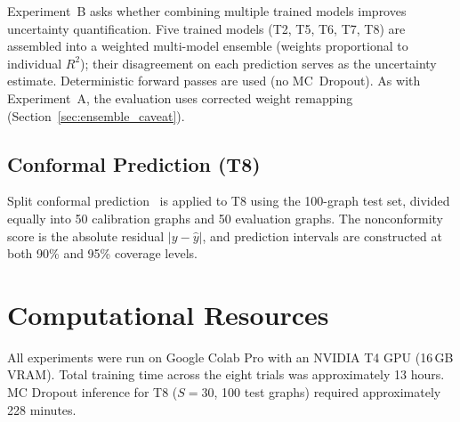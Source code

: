 Experiment~B asks whether combining multiple trained models improves uncertainty quantification. Five trained models (T2, T5, T6, T7, T8) are assembled into a weighted multi-model ensemble (weights proportional to individual $R^2$); their disagreement on each prediction serves as the uncertainty estimate. Deterministic forward passes are used (no MC~Dropout). As with Experiment~A, the evaluation uses corrected weight remapping (Section~\ref{sec:ensemble_caveat}).

\subsection{Conformal Prediction (T8)}

Split conformal prediction~\cite{angelopoulos2023conformal} is applied to T8 using the 100-graph test set, divided equally into 50 calibration graphs and 50 evaluation graphs. The nonconformity score is the absolute residual $|y - \hat{y}|$, and prediction intervals are constructed at both 90\% and 95\% coverage levels.

\section{Computational Resources}

All experiments were run on Google Colab Pro with an NVIDIA T4 GPU (16\,GB VRAM). Total training time across the eight trials was approximately 13 hours. MC Dropout inference for T8 ($S = 30$, 100 test graphs) required approximately 228 minutes.
